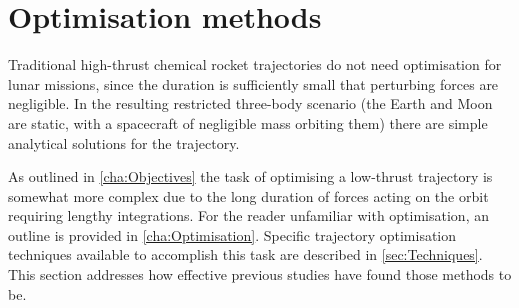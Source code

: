 
\section{Optimisation methods} \label{sec:Optimisation-methods}
Traditional high-thrust chemical rocket trajectories do not need optimisation for lunar missions, since the duration is sufficiently small that perturbing forces are negligible. In the resulting restricted three-body scenario (the Earth and Moon are static, with a spacecraft of negligible mass orbiting them) there are simple analytical solutions for the trajectory.

As outlined in \autoref{cha:Objectives} the task of optimising a low-thrust trajectory is somewhat more complex due to the long duration of forces acting on the orbit requiring lengthy integrations. For the reader unfamiliar with optimisation, an outline is provided in \autoref{cha:Optimisation}. Specific trajectory optimisation techniques available to accomplish this task are described in \autoref{sec:Techniques}. This section addresses how effective previous studies have found those methods to be.

